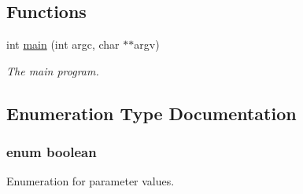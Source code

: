 \subsection*{Functions}
\begin{CompactItemize}
\item 
int \hyperlink{group__applications__quadratureS2__test_g3c04138a5bfe5d72780bb7e82a18e627}{main} (int argc, char $\ast$$\ast$argv)
\begin{CompactList}\small\item\em The main program. \item\end{CompactList}\end{CompactItemize}


\subsection{Enumeration Type Documentation}
\hypertarget{group__applications__quadratureS2__test_g7c6368b321bd9acd0149b030bb8275ed}{
\subsubsection{\setlength{\rightskip}{0pt plus 5cm}enum {\bf boolean}}}
\label{group__applications__quadratureS2__test_g7c6368b321bd9acd0149b030bb8275ed}


Enumeration for parameter values. 

